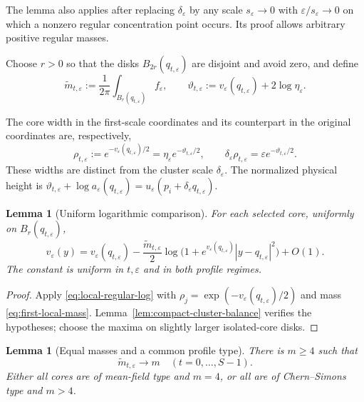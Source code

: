 \documentclass[11pt,reqno]{amsart}
\numberwithin{equation}{section}
\newtheorem{lemma}[theorem]{Lemma}
\theoremstyle{definition}
\theoremstyle{remark}
\newcommand{\eps}{\varepsilon}
\newcommand{\etae}{\eta_{\eps}}
\newcommand{\de}{\delta_{\eps}}
\begin{document}
The lemma also applies after replacing $\de$ by any scale
$s_\eps\to0$ with $\eps/s_\eps\to0$ on which a nonzero regular
concentration point occurs. Its proof allows arbitrary positive regular masses.

Choose $r>0$ so that the disks $B_{2r}(q_{t,\eps})$ are disjoint
and avoid zero, and define
\begin{equation}\label{eq:first-local-mass}
 \widetilde m_{t,\eps}:=\frac1{2\pi}
       \int_{B_r(q_{t,\eps})}f_\eps,\qquad
 \vartheta_{t,\eps}:=v_\eps(q_{t,\eps})+2\log\etae.
\end{equation}

The core width in the first-scale coordinates and its counterpart
in the original coordinates are, respectively,
\[
 \rho_{t,\eps}:=e^{-v_\eps(q_{t,\eps})/2}
       =\etae e^{-\vartheta_{t,\eps}/2},
 \qquad
 \de\rho_{t,\eps}=\eps e^{-\vartheta_{t,\eps}/2}.
\]
These widths are distinct from the cluster scale $\de$.
The normalized physical height is
$\vartheta_{t,\eps}+\log a_\eps(q_{t,\eps})
=u_\eps(p_i+\de q_{t,\eps})$.

\begin{lemma}[Uniform logarithmic comparison]\label{lem:isolated-core-log}
For each selected core, uniformly on $B_r(q_{t,\eps})$,
\begin{equation}\label{eq:isolated-core-log}
 v_\eps(y)=v_\eps(q_{t,\eps})
 -\frac{\widetilde m_{t,\eps}}2
 \log\bigl(1+e^{v_\eps(q_{t,\eps})}|y-q_{t,\eps}|^2\bigr)+O(1).
\end{equation}
The constant is uniform in $t,\eps$ and in both profile regimes.
\end{lemma}
\begin{proof}
Apply \eqref{eq:local-regular-log} with
$\rho_j=\exp(-v_\eps(q_{t,\eps})/2)$ and mass
\eqref{eq:first-local-mass}. Lemma~\ref{lem:compact-cluster-balance}
verifies the hypotheses; choose the maxima on slightly larger
isolated-core disks.
\end{proof}

\begin{lemma}[Equal masses and a common profile type]
\label{lem:equal-core-masses}
There is $m\ge4$ such that
\begin{equation}\label{eq:common-local-mass}
 \widetilde m_{t,\eps}\longrightarrow m
 \quad(t=0,\ldots,S-1).
\end{equation}
Either all cores are of mean-field type and $m=4$, or all are of
Chern--Simons type and $m>4$.
\end{lemma}
\end{document}

